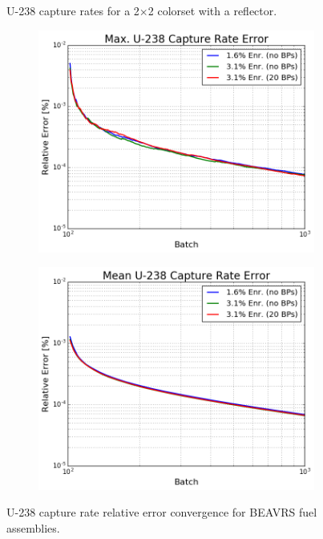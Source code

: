 \begin{figure}[h!]
\begin{subfigure}{0.5\textwidth}
  \caption{}
  \label{fig:chap7-capt-rate-rel-err-reflector}
\end{subfigure}%
\caption[U-238 capture rates for a 2$\times$2 colorset with a reflector]{U-238 capture rates for a 2$\times$2 colorset with a reflector.}
\label{fig:chap7-capt-rates-2x2}
\end{figure}

\begin{figure}[h!]
\centering
\begin{subfigure}{0.5\textwidth}
  \centering
  \includegraphics[width=\linewidth]{figures/benchmarks/capture-rates/capt-conv-max-assms}
  \caption{}
  \label{fig:chap7-capt-rate-max-conv-assms}
\end{subfigure}%
\begin{subfigure}{0.5\textwidth}
  \centering
  \includegraphics[width=\linewidth]{figures/benchmarks/capture-rates/capt-conv-mean-assms}
  \caption{}
  \label{fig:chap7-capt-rate-max-conv-assms}
\end{subfigure}%
\caption[U-238 capture rate error convergence for BEAVRS assemblies]{U-238 capture rate relative error convergence for \ac{BEAVRS} fuel assemblies.}
\label{fig:chap7-capt-rates-conv-assm}
\end{figure}

